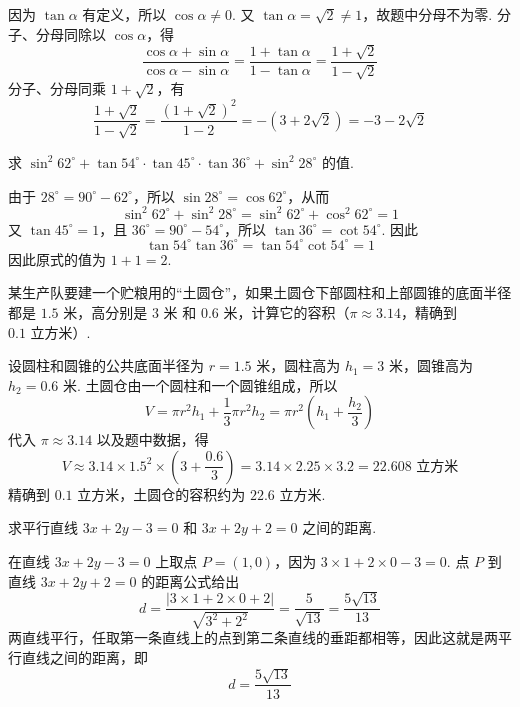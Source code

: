 \begin{solution}
因为 \(\tan\alpha\) 有定义，所以 \(\cos\alpha\ne0\). 又 \(\tan\alpha=\sqrt2\ne1\)，故题中分母不为零. 分子、分母同除以 \(\cos\alpha\)，得
\[
\frac{\cos\alpha+\sin\alpha}{\cos\alpha-\sin\alpha}
=\frac{1+\tan\alpha}{1-\tan\alpha}
=\frac{1+\sqrt2}{1-\sqrt2}
\]
分子、分母同乘 \(1+\sqrt2\)，有
\[
\frac{1+\sqrt2}{1-\sqrt2}
=\frac{\left(1+\sqrt2\right)^2}{1-2}
=-\left(3+2\sqrt2\right)=-3-2\sqrt2
\]
\end{solution}

\begin{problem}
求 \(\sin^2 62^\circ+\tan54^\circ\cdot\tan45^\circ\cdot\tan36^\circ+\sin^2 28^\circ\) 的值.
\end{problem}

\begin{solution}
由于 \(28^\circ=90^\circ-62^\circ\)，所以 \(\sin28^\circ=\cos62^\circ\)，从而
\[
\sin^2 62^\circ+\sin^2 28^\circ
=\sin^2 62^\circ+\cos^2 62^\circ=1
\]
又 \(\tan45^\circ=1\)，且 \(36^\circ=90^\circ-54^\circ\)，所以 \(\tan36^\circ=\cot54^\circ\). 因此
\[
\tan54^\circ\tan36^\circ
=\tan54^\circ\cot54^\circ=1
\]
因此原式的值为 \(1+1=2\).
\end{solution}

\begin{problem}
某生产队要建一个贮粮用的“土圆仓”，如果土圆仓下部圆柱和上部圆锥的底面半径都是 \(1.5\text{ 米}\)，高分别是 \(3\text{ 米}\) 和 \(0.6\text{ 米}\)，计算它的容积（\(\pi\approx 3.14\)，精确到 \(0.1\text{ 立方米}\)）.

\end{problem}

\begin{solution}
设圆柱和圆锥的公共底面半径为 \(r=1.5\text{ 米}\)，圆柱高为 \(h_1=3\text{ 米}\)，圆锥高为 \(h_2=0.6\text{ 米}\). 土圆仓由一个圆柱和一个圆锥组成，所以
\[
V=\pi r^2h_1+\frac{1}{3}\pi r^2h_2
=\pi r^2\left(h_1+\frac{h_2}{3}\right)
\]
代入 \(\pi\approx3.14\) 以及题中数据，得
\[
V\approx3.14\times1.5^2\times\left(3+\frac{0.6}{3}\right)
=3.14\times2.25\times3.2
=22.608\text{ 立方米}
\]
精确到 \(0.1\text{ 立方米}\)，土圆仓的容积约为 \(22.6\text{ 立方米}\).
\end{solution}

\begin{problem}
求平行直线 \(3x+2y-3=0\) 和 \(3x+2y+2=0\) 之间的距离.
\end{problem}

\begin{solution}
在直线 \(3x+2y-3=0\) 上取点 \(P=\left(1,0\right)\)，因为 \(3\times1+2\times0-3=0\). 点 \(P\) 到直线 \(3x+2y+2=0\) 的距离公式给出
\[
d=\frac{|3\times1+2\times0+2|}{\sqrt{3^2+2^2}}
=\frac{5}{\sqrt{13}}
=\frac{5\sqrt{13}}{13}
\]
两直线平行，任取第一条直线上的点到第二条直线的垂距都相等，因此这就是两平行直线之间的距离，即
\[
d=\frac{5\sqrt{13}}{13}
\]
\end{solution}

